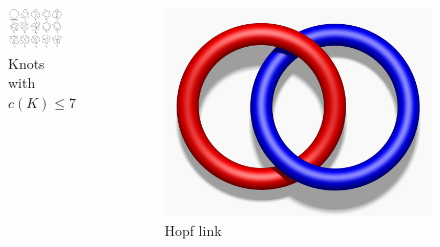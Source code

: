 \documentclass{beamer}
\theoremstyle{ex}
\theoremstyle{rem}
\begin{document}
\begin{frame}
		\begin{columns}[onlytextwidth]
			\begin{column}{.4\textwidth}
				\begin{figure}
					\includegraphics[width=\textwidth]{examples}
					\caption{Knots with $c(K)\leq 7$}
				\end{figure}
			\end{column}
			\hfill
			\begin{column}{.4\textwidth}
				\begin{figure}
					\includegraphics[width=\textwidth]{hopf}
					\caption{Hopf link}
				\end{figure}
			\end{column}
		\end{columns}
	\end{frame}
\end{document}
